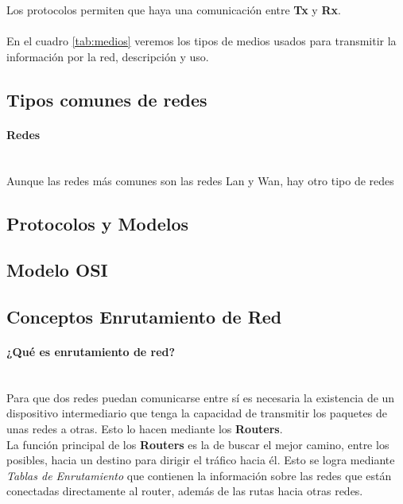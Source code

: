 \documentclass[a4paper]{report} %
\begin{document}
              Los protocolos permiten que haya una comunicación entre \textbf{Tx} y \textbf{Rx}.
              \\\\En el cuadro \ref{tab:medios} veremos los tipos de medios usados para transmitir la información por la red, descripción y uso.
            \subsection{Tipos comunes de redes}
              \paragraph{Redes}\mbox{} \\
                Aunque las redes más comunes son las redes Lan y Wan, hay otro tipo de redes
            \subsection{Protocolos y Modelos}
            \subsection{Modelo OSI}
            \subsection{Conceptos Enrutamiento de Red}
              \paragraph{¿Qué es enrutamiento de red?}\mbox{} \\
                Para que dos redes puedan comunicarse entre sí es necesaria la existencia de un dispositivo intermediario que tenga la capacidad de transmitir los paquetes de unas redes a otras. Esto lo hacen mediante los \textbf{Routers}.
                \\La función principal de los \textbf{Routers} es la de buscar el mejor camino, entre los posibles, hacia un destino para dirigir el tráfico hacia él. Esto se logra mediante \textit{Tablas de Enrutamiento} que contienen la información sobre las redes que están conectadas directamente al router, además de las rutas hacia otras redes.
\end{document}
